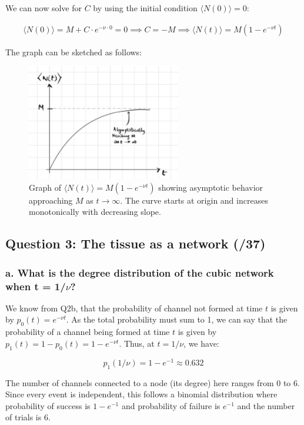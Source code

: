 \documentclass{article}
\begin{document}
We can now solve for $C$ by using the initial condition $\langle N(0) \rangle =
    0$:

\begin{align*}
    \langle N(0) \rangle = M + C \cdot e^{-\nu \cdot 0} = 0 \implies C = -M \implies \boxed{\langle N(t) \rangle = M (1 - e^{-\nu t})}
\end{align*}

The graph can be sketched as follows:
\begin{figure}[htbp]
    \centering
    \includegraphics[width=0.6\textwidth]{figures/asymp_graph.jpg}
    \caption{\centering Graph of $\langle N(t) \rangle = M(1-e^{-\nu t})$ showing asymptotic behavior approaching $M$ as $t \to \infty$. The curve starts at origin and increases monotonically with decreasing slope.}\label{fig:asymp_graph}
\end{figure}

\newpage
\subsection*{Question 3: The tissue as a network (/37)}

\subsubsection*{a. What is the degree distribution of the cubic network when t = 1/$\nu$?}
We know from Q2b, that the probability of channel not formed at time $t$ is given by $p_0(t) = e^{-\nu t}$. As the total probability must sum to 1, we can say that the probability of a channel being formed at time $t$ is given by $p_1(t) = 1 - p_0(t) = 1 - e^{-\nu t}$. Thus, at $t = 1/\nu$, we have:

\[
    p_1(1/\nu) = 1 - e^{-1} \approx 0.632
\]

The number of channels connected to a node (its degree) here ranges from 0 to
6. Since every event is independent, this follows a binomial distribution where
probability of success is $1-e^{-1}$ and probability of failure is $e^{-1}$ and
the number of trials is 6.
\end{document}

